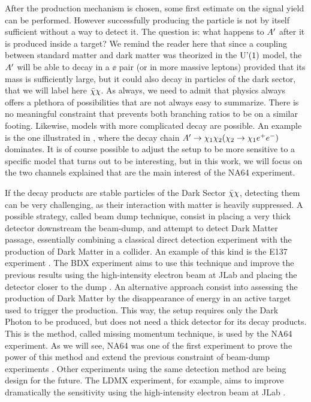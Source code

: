 After the production mechanism is chosen, some first estimate on the signal yield can be performed. However successfully producing the particle is not by itself sufficient without a way to detect it. The question is: what happens to $A'$ after it is produced inside a target? We remind the reader here that since a coupling between standard matter and dark matter was theorized in the $\textrm{U'(1)}$ model, the $A'$ will be able to decay in a $\ee$ pair (or in more massive leptons) provided that its mass is sufficiently large, but it could also decay in particles of the dark sector, that we will label here $\bar{\chi} \chi$. As always, we need to admit that physics always offers a plethora of possibilities that are not always easy to summarize. There is no meaningful constraint that prevents both branching ratios to be on a similar footing. Likewise, models with more complicated decay are possible. An example is the one illustrated in \cite{Mohlabeng_2019}, where the decay chain $A' \to \chi_1 \chi_2(\chi_2 \to \chi_1 e^+e^-)$ dominates. It is of course possible to adjust the setup to be more sensitive to a specific model that turns out to be interesting, but in this work, we will focus on the two channels explained that are the main interest of the NA64 experiment.

If the decay products are stable particles of the Dark Sector $\bar{\chi} \chi$, detecting them can be very challenging, as their interaction with matter is heavily suppressed. A possible strategy, called beam dump technique, consist in placing a very thick detector downstream the beam-dump, and attempt to detect Dark Matter passage, essentially combining a classical direct detection experiment with the production of Dark Matter in a collider. An example of this kind is the E137 experiment \cite{e137}. The BDX experiment aims to use this technique and improve the previous results using the high-intensity electron beam at JLab and placing the detector closer to the dump \cite{Battaglieri:2019nok}. An alternative approach consist into assessing the production of Dark Matter by the disappearance of energy in an active target used to trigger the production. This way, the setup requires only the Dark Photon to be produced, but does not need a thick detector for its decay products. This is the method, called missing momentum technique, is used by the NA64 experiment. As we will see, NA64 was one of the first experiment to prove the power of this method and extend the previous constraint of beam-dump experiments \cite{NA64:2019imj}. Other experiments using the same detection method are being design for the future. The LDMX experiment, for example, aims to improve dramatically the sensitivity using the high-intensity electron beam at JLab \cite{Moreno:2019tfm}.

